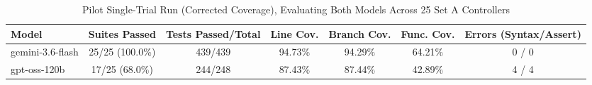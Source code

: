\begin{table}[htbp]
\centering
\caption{Pilot Single-Trial Run (Corrected Coverage), Evaluating Both Models Across 25 Set A Controllers}
\label{tab:pilot_run_corrected}
\begin{tabular}{lcccccc}
\toprule
\textbf{Model} & \textbf{Suites Passed} & \textbf{Tests Passed/Total} & \textbf{Line Cov.} & \textbf{Branch Cov.} & \textbf{Func. Cov.} & \textbf{Errors (Syntax/Assert)} \\
\midrule
gemini-3.6-flash & 25/25 (100.0\%) & 439/439 & 94.73\% & 94.29\% & 64.21\% & 0 / 0 \\
gpt-oss-120b & 17/25 (68.0\%) & 244/248 & 87.43\% & 87.44\% & 42.89\% & 4 / 4 \\
\bottomrule
\end{tabular}
\end{table}
